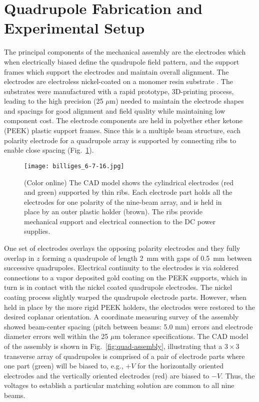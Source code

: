 \documentclass[%
 aip,
rsi,%
 amsmath,amssymb,
 reprint,%
]{revtex4-1}
\begin{document}
\section{Quadrupole Fabrication and Experimental Setup}
The principal components of the mechanical assembly are the electrodes which when electrically biased define the quadrupole field pattern, and the support frames which support the electrodes and maintain overall alignment.  The electrodes are electroless nickel-coated on a monomer resin substrate \cite{protolabs}.  The substrates were manufactured with a rapid prototype, 3D-printing process, leading to the high precision (25 $\mu$m) needed to maintain the electrode shapes and spacings for good alignment and field quality while maintaining low component cost.  The electrode components are held in polyether ether ketone (PEEK) plastic support frames.  Since this is a multiple beam structure, each polarity electrode for a quadrupole array is supported by connecting ribs to enable close spacing (Fig.~\ref{fig:quad-detail}).   

\begin{figure}[ht!]
  \centering
  \texttt{[image: billiges\_6-7-16.jpg]}
  \caption{(Color online) The CAD model shows the cylindrical electrodes (red and green) supported by thin ribs. Each electrode part holds all the electrodes for one polarity of the nine-beam array, and is held in place by an outer plastic holder (brown). The ribs provide mechanical support and electrical connection to the DC power supplies.}
  \label{fig:quad-detail}
\end{figure}

One set of electrodes overlays the opposing polarity electrodes and they fully overlap in $z$ forming a quadrupole of length 2~mm with gaps of 0.5~mm between successive quadrupoles. Electrical continuity to the electrodes is via soldered connections to a vapor deposited gold coating on the PEEK supports, which in turn is in contact with the nickel coated quadrupole electrodes.  The nickel coating process slightly warped
the quadrupole electrode parts.  However, when held in place by the more rigid PEEK holders, the electrodes were restored to the desired coplanar orientation. A coordinate measuring survey of the assembly showed beam-center spacing (pitch between beams: 5.0 mm) errors and electrode diameter errors well within the 25 $\mu$m tolerance specifications. 
The CAD model of the assembly is shown in Fig.~\ref{fig:quad-assembly}, illustrating that a $3 \times 3$ transverse array of quadrupoles is comprised of a pair of electrode parts where one part (green) will be biased to, e.g., $+V$ for the horizontally oriented electrodes and the vertically oriented electrodes (red) are biased to $-V$. Thus, the voltages to establish a particular matching solution are common to all nine beams.
\end{document}
